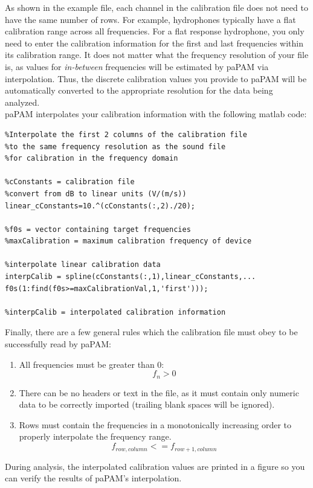 \documentclass[11pt]{report}
\begin{document}
As shown in the example file, each channel in the calibration file does not need to have the same number of rows.  For example, hydrophones typically have a flat calibration range across all frequencies.  For a flat response hydrophone, you only need to enter the calibration information for the first and last frequencies within its calibration range.  It does not matter what the frequency resolution of your file is, as values for \textit{in-between} frequencies will be estimated by paPAM via interpolation.  Thus, the discrete calibration values you provide to paPAM will be automatically converted to the appropriate resolution for the data being analyzed.\\
	
	paPAM interpolates your calibration information with the following matlab code:
	
\begin{lstlisting}
%Interpolate the first 2 columns of the calibration file
%to the same frequency resolution as the sound file
%for calibration in the frequency domain

%cConstants = calibration file
%convert from dB to linear units (V/(m/s))
linear_cConstants=10.^(cConstants(:,2)./20);

%f0s = vector containing target frequencies
%maxCalibration = maximum calibration frequency of device

%interpolate linear calibration data
interpCalib = spline(cConstants(:,1),linear_cConstants,...
f0s(1:find(f0s>=maxCalibrationVal,1,'first')));

%interpCalib = interpolated calibration information

\end{lstlisting}
	
	
Finally, there are a few general rules which the calibration file must obey to be successfully read by paPAM:
\begin{enumerate}
\item All frequencies must be greater than 0: $$f_n > 0$$
\item There can be no headers or text in the file, as it must contain only numeric data to be correctly imported (trailing blank spaces will be ignored).
\item Rows must contain the frequencies in a monotonically increasing order to properly interpolate the frequency range. $$f_{row, column} <= f_{row+1, column} $$
\end{enumerate}
	
	
	During analysis, the interpolated calibration values are printed in a figure so you can verify the results of paPAM's interpolation.
\end{document}
